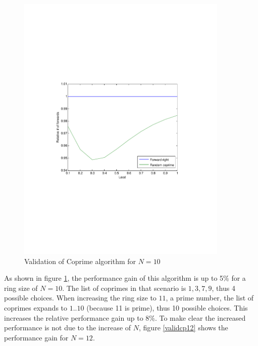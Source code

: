 \documentclass[10pt,a4paper]{article}
\begin{document}
\begin{figure}[h!tb]
\centering
\includegraphics[clip=true, trim=9em 24em 9em 24em, width=0.9\textwidth]{resources/plotrandcoprime.pdf}
\caption{Validation of Coprime algorithm for $N=10$}
\label{validcp}
\end{figure}

As shown in figure \ref{validcp}, the performance gain of this algorithm is up to 5\% for a ring size of $N=10$. The list of coprimes in that scenario is ${1, 3, 7, 9}$, thus 4 possible choices. When increasing the ring size to $11$, a prime number, the list of coprimes expands to ${1..10}$ (because 11 is prime), thus 10 possible choices. This increases the relative performance gain up to 8\%. To make clear the increased performance is not due to the increase of $N$, figure \ref{validcp12} shows the performance gain for $N=12$.
\end{document}
